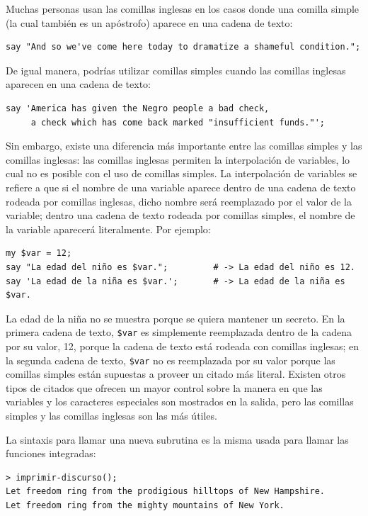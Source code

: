 Muchas personas usan las comillas inglesas en los casos
donde una comilla simple (la cual también es un apóstrofo)
aparece en una cadena de texto:
\begin{verbatim}
say "And so we've come here today to dramatize a shameful condition.";
\end{verbatim}
%
De igual manera, podrías utilizar comillas simples 
cuando las comillas inglesas aparecen en una cadena de texto:
\begin{verbatim}
say 'America has given the Negro people a bad check, 
     a check which has come back marked "insufficient funds."';
\end{verbatim}
%
Sin embargo, existe una diferencia más importante entre las 
comillas simples y las comillas inglesas: las comillas inglesas
permiten la interpolación de variables, lo cual no es posible
con el uso de comillas simples. La interpolación de variables
se refiere a que si el nombre de una variable aparece dentro
de una cadena de texto rodeada por comillas inglesas, dicho 
nombre será reemplazado por el valor de la variable; dentro una 
cadena de texto rodeada por comillas simples, el nombre de la 
variable aparecerá literalmente.
Por ejemplo:
%
\begin{verbatim}
my $var = 12;
say "La edad del niño es $var.";         # -> La edad del niño es 12.
say 'La edad de la niña es $var.';       # -> La edad de la niña es $var.
\end{verbatim}
%
La edad de la niña no se muestra porque se quiera mantener un
secreto. En la primera cadena de texto, \verb|$var| es 
simplemente reemplazada dentro de la cadena por su valor, 12, porque
la cadena de texto está rodeada con comillas inglesas; en la segunda
cadena de texto, \verb|$var| no es reemplazada por su valor porque las 
comillas simples están supuestas a proveer un citado más literal. 
Existen otros tipos de citados que ofrecen un mayor control sobre la
manera en que las variables y los caracteres especiales son mostrados 
en la salida, pero las comillas simples y las comillas inglesas
son las más útiles.

La sintaxis para llamar una nueva subrutina es la misma usada
para llamar las funciones integradas:

\begin{verbatim}
> imprimir-discurso();
Let freedom ring from the prodigious hilltops of New Hampshire.
Let freedom ring from the mighty mountains of New York.
\end{verbatim}
%

